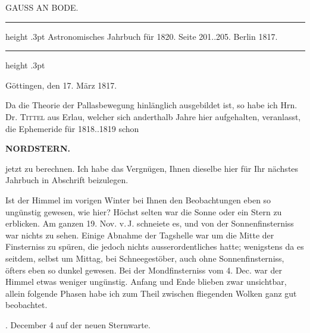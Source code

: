 \par\bigskip
{}
\hypertarget{native-404-part-lower}{}\label{native-404-part-lower}
\begin{center}\large GAUSS AN BODE.\end{center}
\begin{center}
\parbox{.69\linewidth}{%
\centering\small
\hrule height .3pt\relax\vspace{2.5pt}
Astronomisches Jahrbuch für 1820. Seite 201..205. Berlin 1817.\par
\vspace{2.5pt}\hrule height .3pt\relax
}
\end{center}
\begin{flushright}Göttingen, den 17. März 1817.\end{flushright}
\par\indent Da die Theorie der Pallasbewegung hinlänglich ausgebildet ist, so habe ich Hrn. Dr. \textsc{Tittel} aus Erlau, welcher sich anderthalb Jahre hier aufgehalten, veranlasst, die Ephemeride für 1818..1819 schon\par
\clearpage
\thispagestyle{empty}
\noindent{}%
%
\parbox[t]{\dimexpr\linewidth-24mm\relax}{\centering\footnotesize\bfseries NORDSTERN.\par}%
\makebox[12mm][r]{}\par\nobreak\medskip
\noindent jetzt zu berechnen. Ich habe das Vergnügen, Ihnen dieselbe hier für Ihr nächstes Jahrbuch in Abschrift beizulegen.

\par\indent Ist der Himmel im vorigen Winter bei Ihnen den Beobachtungen eben so ungünstig gewesen, wie hier? Höchst selten war die Sonne oder ein Stern zu erblicken. Am ganzen 19. Nov. v.\,J. schneiete es, und von der Sonnenfinsterniss war nichts zu sehen. Einige Abnahme der Tagshelle war um die Mitte der Finsterniss zu spüren, die jedoch nichts ausserordentliches hatte; wenigstens da es seitdem, selbst um Mittag, bei Schneegestöber, auch ohne Sonnenfinsterniss, öfters eben so dunkel gewesen. Bei der Mondfinsterniss vom 4. Dec. war der Himmel etwas weniger ungünstig. Anfang und Ende blieben zwar unsichtbar, allein folgende Phasen habe ich zum Theil zwischen fliegenden Wolken ganz gut beobachtet.

\par{}. December 4 auf der neuen Sternwarte.

